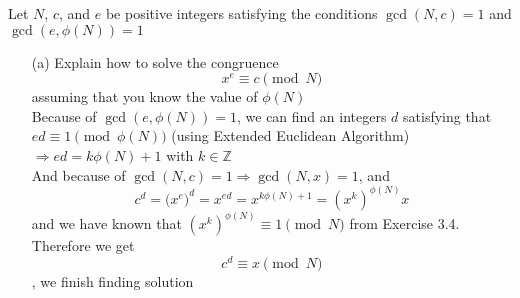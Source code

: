 \begin{exer}[3.6] Let $N$, $c$, and $e$ be positive integers satisfying the conditions $\gcd(N,c)=1$ and $\gcd(e,\phi(N))=1$
	\begin{enumerate}
		\item [(a)] Explain how to solve the congruence \[x^e \equiv c \pmod{N}\] assuming that you know the value of $\phi(N)$ \\ Because of $\gcd(e, \phi(N)) = 1$, we can find an integers $d$ satisfying that $ed \equiv 1 \pmod{\phi(N)}$ (using Extended Euclidean Algorithm) \\ $\Rightarrow ed = k\phi(N) + 1$ with $k \in \mathbb{Z}$ \\ And because of $\gcd(N, c)=1 \Rightarrow \gcd(N,x)=1$, and \[c^d = \Big(x^e\Big)^d = x^{ed} = x^{k\phi(N) + 1} = (x^k)^{\phi(N)}x\] and we have known that $(x^k)^{\phi(N)} \equiv 1 \pmod{N}$ from Exercise 3.4. Therefore we get \[c^d \equiv x \pmod{N}\], we finish finding solution
	\end{enumerate}
\end{exer}

